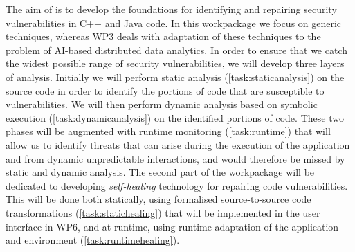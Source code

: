 \begin{Workpackage}{\thewpno}
\begin{WPDescription}
The aim of \theWP{} is to develop the foundations %
for identifying and repairing security vulnerabilities in C++ and Java code. In this workpackage we focus on generic techniques, whereas WP3 deals with adaptation of these techniques to the problem of AI-based distributed data analytics. In order to ensure that we catch the widest possible range of security vulnerabilities, we will develop three layers of analysis. Initially we will perform static analysis (\ref{task:staticanalysis}) on the source code in order to identify the portions of code that are susceptible to vulnerabilities. We will then perform dynamic analysis based on symbolic execution (\ref{task:dynamicanalysis}) on the identified portions of code. These two phases will be augmented with runtime monitoring (\ref{task:runtime}) that will allow us to identify threats that can arise during the execution of the application and from dynamic unpredictable interactions, and would therefore be missed by static and dynamic analysis. The second part of the workpackage will be dedicated to developing \emph{self-healing} technology for repairing code vulnerabilities. This will be done both statically, using formalised source-to-source code transformations ({\ref{task:statichealing}}) that will be implemented in the user interface in WP6, and at runtime, using runtime adaptation of the application and environment (\ref{task:runtimehealing}).
\end{WPDescription}


\end{Workpackage}
